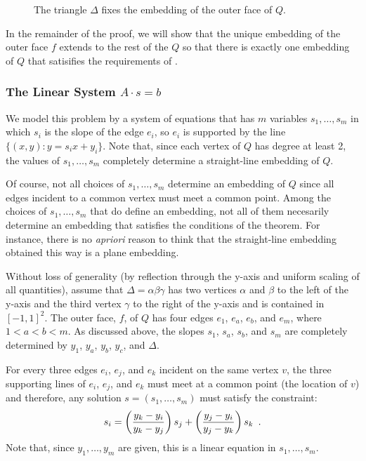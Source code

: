 \documentclass{patmorin}
\begin{document}
\begin{figure}
   \caption{The triangle $\Delta$ fixes the embedding of the outer face of $Q$.}
\end{figure}

In the remainder of the proof, we will show that the unique embedding of
the outer face $f$ extends to the rest of the $Q$ so that there is exactly
one embedding of $Q$ that satisifies the requirements of .

\subsubsection{The Linear System $A\cdot s=b$}

We model this problem by a system of equations that has $m$ variables
$s_1,\ldots,s_m$ in which $s_i$ is the slope of the edge $e_i$, so $e_i$
is supported by the line $\{(x,y):y=s_ix + y_i\}$.  Note that, since
each vertex of $Q$ has degree at least 2, the values of $s_1,\ldots,s_m$
completely determine a straight-line embedding of $Q$.

Of course, not all choices of $s_1,\ldots,s_m$ determine an embedding of
$Q$ since all edges incident to a common vertex must meet a common point.
Among the choices of $s_1,\ldots,s_m$ that do define an embedding, not all
of them necesarily determine an embedding that satisfies the conditions
of the theorem. For instance, there is no \emph{apriori} reason to think
that the straight-line embedding obtained this way is a plane embedding.

Without loss of generality (by reflection through the y-axis and uniform
scaling of all quantities), assume that $\Delta=\alpha\beta\gamma$
has two vertices $\alpha$ and $\beta$ to the left of the y-axis and
the third vertex $\gamma$ to the right of the y-axis and is contained
in $[-1,1]^2$.  The outer face, $f$, of $Q$ has four edges $e_1$, $e_a$,
$e_b$, and $e_m$, where $1 < a < b < m$.  As discussed above, the slopes
$s_1$, $s_a$, $s_b$, and $s_m$ are completely determined by $y_1$, $y_a$,
$y_b$, $y_c$, and $\Delta$.

For every three edges $e_i$, $e_j$, and $e_k$ incident on the same
vertex $v$, the three supporting lines of $e_i$, $e_j$, and $e_k$ must
meet at a common point (the location of $v$) and therefore, any solution
$s=(s_1,\ldots,s_m)$ must satisfy the constraint:
\begin{equation}\eqlabel{slope} 
    s_i = \left(\frac{y_k-y_i}{y_k-y_j}\right) s_j 
          + \left(\frac{y_j-y_i}{y_j-y_k}\right)s_k \enspace .
\end{equation}
Note that, since $y_1,\ldots,y_m$ are given, this is a linear equation
in $s_1,\ldots,s_m$.
\end{document}
